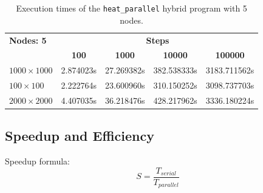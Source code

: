 \documentclass[12pt]{article}
\begin{document}
\begin{table}[h!]
	\centering
	\begin{tabular}{lcccc}
		\hline
		\textbf{Nodes: 5} & \multicolumn{4}{c}{\textbf{Steps}}                                                    \\
		\cline{2-5}
		                  & \textbf{100}                       & \textbf{1000} & \textbf{10000} & \textbf{100000} \\
		\hline
		$1000\times 1000$ & 2.874023s                          & 27.269382s    & 382.538333s    & 3183.711562s    \\
		$100\times 100$   & 2.222764s                          & 23.600960s    & 310.150252s    & 3098.737703s    \\
		$2000\times 2000$ & 4.407035s                          & 36.218476s    & 428.217962s    & 3336.180224s    \\
		\hline
	\end{tabular}
	\caption{Execution times of the \texttt{heat\_parallel} hybrid program with 5 nodes.}
	\label{tab:mpi_times_5_nodes}
\end{table}

\newpage
\subsection{Speedup and Efficiency}
Speedup formula:
\begin{equation}
	S = \frac{T_{serial}}{T_{parallel}}
\end{equation}
\end{document}
